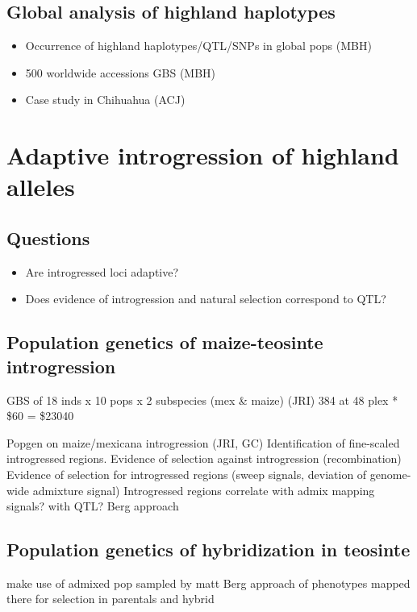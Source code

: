 \subsection{Global analysis of highland haplotypes}
\begin{itemize}
\item Occurrence of highland haplotypes/QTL/SNPs in global pops (MBH)
\item 500 worldwide accessions GBS (MBH)
\item Case study in Chihuahua (ACJ)
\end{itemize}

\section{Adaptive introgression of highland alleles}

\subsection*{Questions}
\begin{itemize}
\item Are introgressed loci adaptive?
\item Does evidence of introgression and natural selection correspond to QTL?
\end{itemize}

\subsection{Population genetics of maize-teosinte introgression} \label{subsec: intropopgen}

GBS of 18 inds x 10 pops x 2 subspecies (mex \& maize) (JRI)
384 at 48 plex * \$60 = \$23040

Popgen on maize/mexicana introgression (JRI, GC)
Identification of fine-scaled introgressed regions.
Evidence of selection against introgression (recombination)
Evidence of selection for introgressed regions (sweep signals, deviation of genome-wide admixture signal)
Introgressed regions correlate with admix mapping signals? with QTL? Berg approach

\subsection{Population genetics of hybridization in teosinte} \label{subsec: admixpopgen}

make use of admixed pop sampled by matt
Berg approach of phenotypes mapped there for selection in parentals and hybrid

